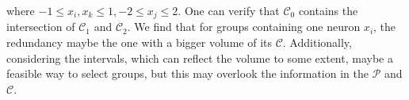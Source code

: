 \documentclass[runningheads]{llncs}
\begin{document}

where $-1 \leq x_{i},x_{k}\leq 1, -2\leq x_{j}\leq 2$. One can verify that $\mathcal{C}_{0}$ contains the intersection of $\mathcal{C}_{1}$ and $\mathcal{C}_{2}$. We find that for groups containing one neuron $x_{i}$, the redundancy maybe the one with a bigger volume of its $\mathcal{C}$. Additionally, considering the intervals, which can reflect the volume to some extent, maybe a feasible way to select groups, but this may overlook the information in the $\mathcal{P}$ and $\mathcal{C}$.
\end{document}
